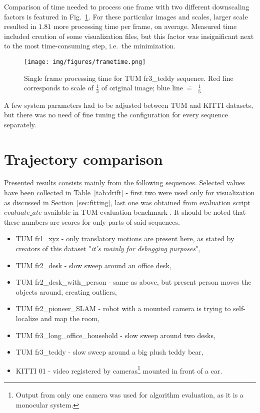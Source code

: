 Comparison of time needed to process one frame with two different downscaling factors is featured in Fig.~\ref{fig:timing}. For these particular images and scales, larger scale resulted in $1.81$ more processing time per frame, on average. Measured time included creation of some visualization files, but this factor was insignificant next to the most time-consuming step, i.e.~the minimization.

\begin{figure}[ht]
	\centering\texttt{[image: img/figures/frametime.png]}
	\caption{ Single frame processing time for TUM fr3\_teddy sequence. Red line corresponds to scale of $\frac{1}{3}$ of original image; blue line~\==~ $\frac{1}{5}$ }
	\label{fig:timing}
\end{figure}


A few system parameters had to be adjusted between TUM and KITTI datasets, but there was no need of fine tuning the configuration for every sequence separately.

\section{Trajectory comparison}

Presented results consists mainly from the following sequences. Selected values have been collected in Table~\ref{tab:drift} - first two were used only for visualization as discussed in Section~\ref{sec:fitting}, last one was obtained from evaluation script $evaluate\_ate$ available in TUM evaluation benchmark \cite{tum}. It should be noted that these numbers are scores for only parts of said sequences.
\begin{itemize}
	\item TUM fr1\_xyz - only translatory motions are present here, as stated by creators of this dataset "\textit{it's mainly for debugging purposes}",
	\item TUM fr2\_desk - slow sweep around an office desk,
	\item TUM fr2\_desk\_with\_person - same as above, but present person moves the objects around, creating outliers,
	\item TUM fr2\_pioneer\_SLAM - robot with a mounted camera is trying to self-localize and map the room,
	\item TUM fr3\_long\_office\_household - slow sweep around two desks,
	\item TUM fr3\_teddy - slow sweep around a big plush teddy bear,
	\item KITTI 01 - video registered by cameras\footnote{Output from only one camera was used for algorithm evaluation, as it is a monocular system.} mounted in front of a car.
\end{itemize}

